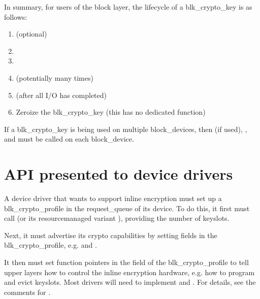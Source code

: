 \documentclass[a4paper,11pt,english]{sphinxmanual}
\begin{document}
In summary, for users of the block layer, the lifecycle of a blk\_crypto\_key is
as follows:
\begin{enumerate}
%
\item {} 
 (optional)

\item {} 

\item {} 

\item {} 
 (potentially many times)

\item {} 
 (after all I/O has completed)

\item {} 
Zeroize the blk\_crypto\_key (this has no dedicated function)

\end{enumerate}

If a blk\_crypto\_key is being used on multiple block\_devices, then
 (if used), ,
and  must be called on each block\_device.


\section{API presented to device drivers}
\label{\detokenize{inline-encryption:api-presented-to-device-drivers}}
A device driver that wants to support inline encryption must set up a
blk\_crypto\_profile in the request\_queue of its device.  To do this, it first
must call  (or its resource\sphinxhyphen{}managed variant
), providing the number of keyslots.

Next, it must advertise its crypto capabilities by setting fields in the
blk\_crypto\_profile, e.g.  and .

It then must set function pointers in the  field of the
blk\_crypto\_profile to tell upper layers how to control the inline encryption
hardware, e.g. how to program and evict keyslots.  Most drivers will need to
implement  and .  For details, see the
comments for .
\end{document}
